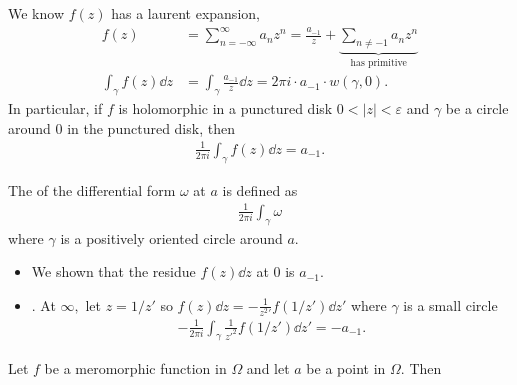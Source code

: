 \documentclass[a4paper,12pt]{article}
\begin{document}
We know $f(z)$ has a laurent expansion, \begin{align}
    f(z)&=\sum_{n=-\infty}^\infty a_nz^n=\frac{a_{-1}}{z}+\underbrace{\sum_{n\neq-1}a_nz^n}_{\text{has primitive}}\\
    \int_\gamma f(z)\dd z&=\int_\gamma\frac{a_{-1}}{z}\dd z=2\pi i\cdot a_{-1}\cdot w(\gamma,0).
\end{align}
In particular, if $f$ is holomorphic in a punctured disk $0<|z|<\varepsilon$ and $\gamma$ be a circle around $0$ in the punctured disk, then \begin{align}
    \frac{1}{2\pi i}\int_\gamma f(z)\dd z=a_{-1}.
\end{align}
\begin{definition}[Residue]
    The  of the differential form $\omega$ at $a$ is defined as \begin{align}
        \frac{1}{2\pi i}\int_\gamma\omega
    \end{align}
    where $\gamma$ is a positively oriented circle around $a.$
\end{definition}
\begin{itemize}
    \item We shown that the residue $f(z)\dd z$ at $0$ is $a_{-1}.$
    \item {}. At $\infty,$ let $z=1/z'$ so $f(z)\dd z=-\frac{1}{{z^2}'}{f(1/z')\dd z'}$ where $\gamma$ is a small circle \begin{align}
        -\frac{1}{2\pi i}\int_\gamma\frac{1}{{z'}^2}f(1/z')\dd z'=-a_{-1}.
    \end{align}
\end{itemize}
\begin{theorem}[Residue]
    Let $f$ be a meromorphic function in $\Omega$ and let $a$ be a point in $\Omega.$ Then
\end{theorem}
\end{document}
